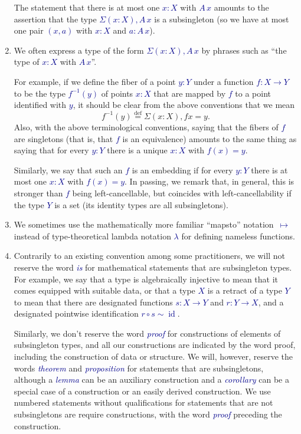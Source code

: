 \documentclass[10pt]{article}
\newcommand{\db}{\textcolor{darkblue}}
\newcommand{\df}[1]{\emph{\db{#1}}}
\newcommand{\m}[1]{\db{$#1$}}
\newcommand{\id}{\operatorname{id}}
\newcommand{\comp}{\mathrel{\circ}}
\newcommand{\eqdef}{\overset{\text{def}}{=}}
\theoremstyle{definition}
\begin{document}
\begin{enumerate}
  The statement that there is at most one \m{x:X} with \m{A \, x}
  amounts to the assertion that the type \m{\Sigma (x:X), A \, x} is a
  subsingleton (so we have at most one pair \m{(x,a)} with \m{x:X} and
  \m{a : A\, x}).

\item We often express a type of the form \m{\Sigma(x:X), A \, x} by
  phrases such as ``the type of \m{x:X} with \m{A \, x}''.

  For example, if we define the fiber of a point \m{y:Y} under a
  function \m{f : X \to Y} to be the type \m{f^{-1}(y)} of points \m{x:X}
  that are mapped by \m{f} to a point identified with \m{y}, it
  should be clear from the above conventions that we mean
  \[
   f^{-1}(y) \eqdef \Sigma (x : X), f x = y.
 \]
 Also, with the above terminological conventions, saying that the
 fibers of \m{f} are singletons (that is, that \m{f} is an equivalence)
 amounts to the same thing as saying that for every \m{y:Y} there is a
 unique \m{x:X} with \m{f(x)=y}.

 Similarly, we say that such an \m{f} is an embedding if for every
 \m{y:Y} there is at most one \m{x:X} with \m{f(x)=y}. In passing, we
 remark that, in general, this is stronger than \m{f} being
 left-cancellable, but coincides with left-cancellability if the type
 \m{Y} is a set (its identity types are all subsingletons).

\item We sometimes use the mathematically more familiar ``mapsto''
  notation~\m{\mapsto} instead of type-theoretical lambda notation
  \m{\lambda} for defining nameless functions.

\item Contrarily to an existing convention among some practitioners,
  we will not reserve the word \df{is} for mathematical statements
  that are subsingleton types. For example, we say that a type is
  algebraically injective to mean that it comes equipped with suitable
  data, or that a type \m{X} is a retract of a type \m{Y} to mean that
  there are designated functions \m{s : X \to Y} and \m{r : Y \to X},
  and a designated pointwise identification \m{r \comp s \sim \id}.

  Similarly, we don't reserve the word \df{proof} for constructions of
  elements of subsingleton types, and all our constructions are
  indicated by the word proof, including the construction of data or
  structure.  We will, however, reserve the words \df{theorem} and
  \df{proposition} for statements that are subsingletons, although a
  \df{lemma} can be an auxiliary construction and a \df{corollary} can
  be a special case of a construction or an easily derived
  construction. We use numbered statements without qualifications for
  statements that are not subsingletons are require constructions,
  with the word \df{proof} preceding the construction.


\end{enumerate}
\end{document}
